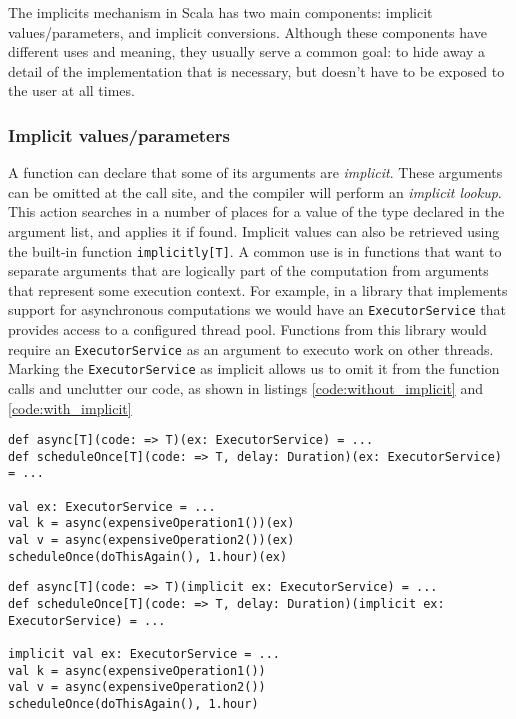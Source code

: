 The implicits mechanism in Scala has two main components: implicit values/parameters, and implicit conversions.
Although these components have different uses and meaning, they usually serve a common goal: to hide away a detail of the implementation that is necessary, but doesn't have to be exposed to the user at all times.

\subsubsection{Implicit values/parameters}

A function can declare that some of its arguments are {\it implicit}.
These arguments can be omitted at the call site, and the compiler will perform an {\it implicit lookup}.
This action searches in a number of places for a value of the type declared in the argument list, and applies it if found.
Implicit values can also be retrieved using the built-in function \texttt{implicitly[T]}.
A common use is in functions that want to separate arguments that are logically part of the computation from arguments that represent some execution context.
For example, in a library that implements support for asynchronous computations we would have an \texttt{ExecutorService} that provides access to a configured thread pool.
Functions from this library would require an \texttt{ExecutorService} as an argument to executo work on other threads.
Marking the \texttt{ExecutorService} as implicit allows us to omit it from the function calls and unclutter our code, as shown in listings \ref{code:without_implicit} and \ref{code:with_implicit}

\begin{lstlisting}[caption=Code without implicits, label=code:without_implicit]
def async[T](code: => T)(ex: ExecutorService) = ...
def scheduleOnce[T](code: => T, delay: Duration)(ex: ExecutorService) = ...

val ex: ExecutorService = ...
val k = async(expensiveOperation1())(ex)
val v = async(expensiveOperation2())(ex)
scheduleOnce(doThisAgain(), 1.hour)(ex)
\end{lstlisting}

\begin{lstlisting}[caption=Code with implicits, label=code:with_implicit]
def async[T](code: => T)(implicit ex: ExecutorService) = ...
def scheduleOnce[T](code: => T, delay: Duration)(implicit ex: ExecutorService) = ...

implicit val ex: ExecutorService = ...
val k = async(expensiveOperation1())
val v = async(expensiveOperation2())
scheduleOnce(doThisAgain(), 1.hour)
\end{lstlisting}

